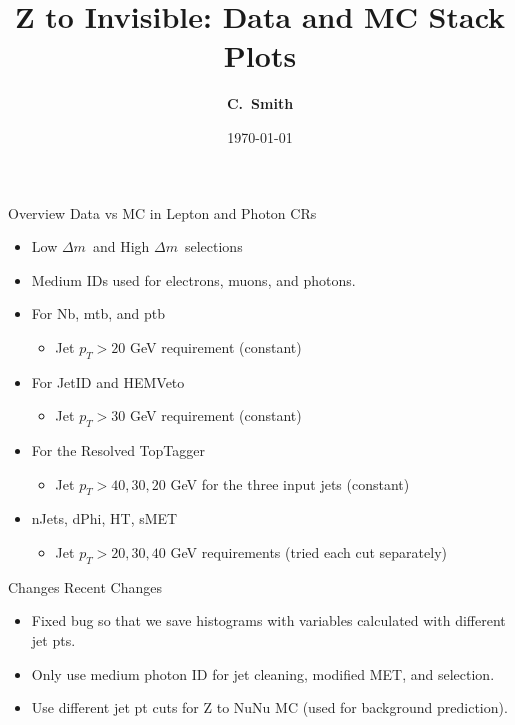\documentclass[10pt,xcolor=svgnames,fleqn,aspectratio=169]{beamer}
\title{Z to Invisible: Data and MC Stack Plots}
\author{\textcolor{DodgerBlueDark}{\bf C.~Smith\inst{1}}}
\institute{\inst{1} Baylor University}
\date{\today}
\newcommand{\dm}{$\Delta m$~}
\begin{document}
\begin{frame}[plain]
\maketitle
\end{frame}

\begin{frame}{Overview}
Data vs MC in Lepton and Photon CRs
\begin{itemize}
\item Low \dm and High \dm selections
\item Medium IDs used for electrons, muons, and photons.
\item For Nb, mtb, and ptb
\begin{itemize}
\item Jet $p_T > 20$ GeV requirement (constant)
\end{itemize}
\item For JetID and HEMVeto
\begin{itemize}
\item Jet $p_T > 30$ GeV requirement (constant)
\end{itemize}
\item For the Resolved TopTagger
\begin{itemize}
\item Jet $p_T > 40, 30, 20$ GeV for the three input jets (constant)
\end{itemize}
\item nJets, dPhi, HT, sMET
\begin{itemize}
\item Jet $p_T > 20, 30, 40$ GeV requirements (tried each cut separately)
\end{itemize}
\end{itemize}
\end{frame}

\begin{frame}{Changes}
Recent Changes
\begin{itemize}
\item Fixed bug so that we save histograms with variables calculated with different jet pts.
\item Only use medium photon ID for jet cleaning, modified MET, and selection.
\item Use different jet pt cuts for Z to NuNu MC (used for background prediction).
\end{itemize}
\end{frame}
\end{document}
